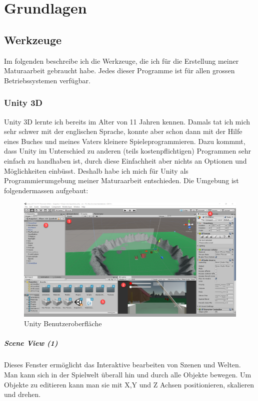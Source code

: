 \chapter{Grundlagen}

\section{Werkzeuge}
Im folgenden beschreibe ich die Werkzeuge, die ich für die Erstellung meiner Maturaarbeit gebraucht habe.
Jedes dieser Programme ist für allen grossen Betriebssystemen verfügbar.

\subsection{Unity 3D}

Unity 3D lernte ich bereits im Alter von 11 Jahren kennen.
Damals tat ich mich sehr schwer mit der englischen Sprache, konnte aber schon dann mit der Hilfe eines Buches und meines Vaters kleinere \glqq Spiele\grqq programmieren.
Dazu kommmt, dass Unity im Unterschied zu anderen (teils kostenpflichtigen) Programmen sehr einfach zu handhaben ist, durch diese Einfachheit aber nichts an Optionen und Möglichkeiten einbüsst. Deshalb habe ich mich für Unity als Programmierumgebung meiner Maturaarbeit entschieden. Die Umgebung ist folgendermassen aufgebaut:

\begin{figure}[H]
\includegraphics[scale=0.4]{screenshots/unityide.png}
\caption{Unity Benutzeroberfläche}
\end{figure}

\paragraph{Scene View (1)}
Dieses Fenster ermöglicht das Interaktive bearbeiten von Szenen und Welten.
Man kann sich in der Spielwelt überall hin und durch alle Objekte bewegen. Um Objekte zu editieren kann man sie mit X,Y und Z Achsen positionieren,
skalieren und drehen.

